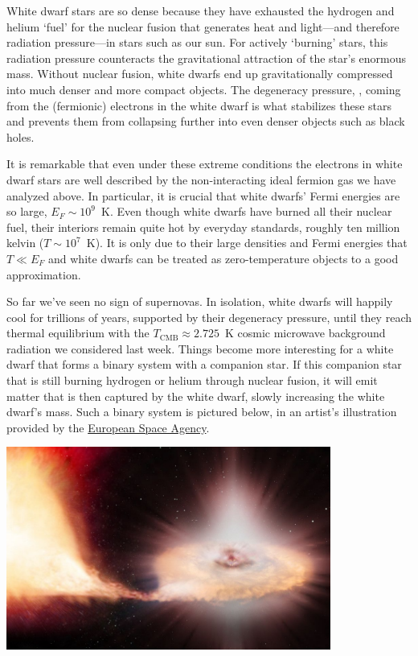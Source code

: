 White dwarf stars are so dense because they have exhausted the hydrogen and helium `fuel' for the nuclear fusion that generates heat and light---and therefore radiation pressure---in stars such as our sun.
For actively `burning' stars, this radiation pressure counteracts the gravitational attraction of the star's enormous mass.
Without nuclear fusion, white dwarfs end up gravitationally compressed into much denser and more compact objects.
The degeneracy pressure, , coming from the (fermionic) electrons in the white dwarf is what stabilizes these stars and prevents them from collapsing further into even denser objects such as black holes.

It is remarkable that even under these extreme conditions the electrons in white dwarf stars are well described by the non-interacting ideal fermion gas we have analyzed above.
In particular, it is crucial that white dwarfs' Fermi energies are so large, $E_F \sim 10^9$~K.
Even though white dwarfs have burned all their nuclear fuel, their interiors remain quite hot by everyday standards, roughly ten million kelvin ($T \sim 10^7$~K). %
It is only due to their large densities and Fermi energies that $T \ll E_F$ and white dwarfs can be treated as zero-temperature objects to a good approximation.

So far we've seen no sign of supernovas.
In isolation, white dwarfs will happily cool for trillions of years, supported by their degeneracy pressure, until they reach thermal equilibrium with the $T_{\text{CMB}} \approx 2.725$~K cosmic microwave background radiation we considered last week.
Things become more interesting for a white dwarf that forms a binary system with a companion star.
If this companion star that is still burning hydrogen or helium through nuclear fusion, it will emit matter that is then captured by the white dwarf, slowly increasing the white dwarf's mass.
Such a binary system is pictured below, in an artist's illustration provided by the \href{https://www.esa.int/ESA_Multimedia/Images/2014/09/Artist_s_impression_of_Type_Ia_supernova}{European Space Agency}.

\begin{center}\includegraphics[width=0.8\textwidth]{figs/week09_nova.pdf}\end{center}

